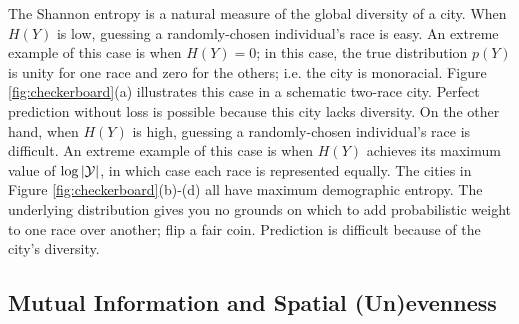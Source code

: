 \documentclass[english]{scrartcl}
\begin{document}
		The Shannon entropy is a natural measure of the global diversity of a city. When $H(Y)$ is low, guessing a randomly-chosen individual's race is easy. An extreme example of this case is when $H(Y) = 0$; in this case, the true distribution $p(Y)$ is unity for one race and zero for the others; i.e. the city is monoracial. Figure \ref{fig:checkerboard}(a) illustrates this case in a schematic two-race city. Perfect prediction without loss is possible because this city lacks diversity. On the other hand, when $H(Y)$ is high, guessing a randomly-chosen individual's race is difficult. An extreme example of this case is when $H(Y)$ achieves its maximum value of $\log \left|\mathcal{Y}\right|$, in which case each race is represented equally. The cities in Figure \ref{fig:checkerboard}(b)-(d) all have maximum demographic entropy. The underlying distribution gives you no grounds on which to add probabilistic weight to one race over another; flip a fair coin. Prediction is difficult because of the city's diversity. 

	\subsection{Mutual Information and Spatial (Un)evenness}
\end{document}
